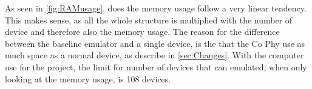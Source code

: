 As seen in \autoref{fig:RAMusage}, does the memory usage follow a very linear tendency. This makes sense, as all the whole structure is multiplied with the number of device and therefore also the memory usage. The reason for the difference between the baseline emulator and a single device, is the that the Co Phy use as much space as a normal device, as describe in \autoref{sec:Changes}. With the computer use for the project, the limit for number of devices that can emulated, when only looking at the memory usage, is 108 devices.



